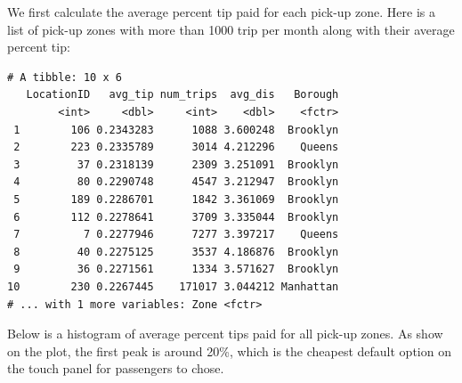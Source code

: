 \documentclass[12pt,twoside]{reedthesis}
\newenvironment{Shaded}{\begin{snugshade}}{\end{snugshade}}
\newcommand{\KeywordTok}[1]{\textcolor[rgb]{0.13,0.29,0.53}{\textbf{#1}}}
\newcommand{\DataTypeTok}[1]{\textcolor[rgb]{0.13,0.29,0.53}{#1}}
\newcommand{\DecValTok}[1]{\textcolor[rgb]{0.00,0.00,0.81}{#1}}
\newcommand{\FloatTok}[1]{\textcolor[rgb]{0.00,0.00,0.81}{#1}}
\newcommand{\StringTok}[1]{\textcolor[rgb]{0.31,0.60,0.02}{#1}}
\newcommand{\OperatorTok}[1]{\textcolor[rgb]{0.81,0.36,0.00}{\textbf{#1}}}
\newcommand{\NormalTok}[1]{#1}
\theoremstyle{definition}
\theoremstyle{definition}
\theoremstyle{definition}
\theoremstyle{remark}
\begin{document}
We first calculate the average percent tip paid for each pick-up zone.
Here is a list of pick-up zones with more than 1000 trip per month along
with their average percent tip:
\begin{Shaded}
\end{Shaded}
\begin{verbatim}
# A tibble: 10 x 6
   LocationID   avg_tip num_trips  avg_dis   Borough
        <int>     <dbl>     <int>    <dbl>    <fctr>
 1        106 0.2343283      1088 3.600248  Brooklyn
 2        223 0.2335789      3014 4.212296    Queens
 3         37 0.2318139      2309 3.251091  Brooklyn
 4         80 0.2290748      4547 3.212947  Brooklyn
 5        189 0.2286701      1842 3.361069  Brooklyn
 6        112 0.2278641      3709 3.335044  Brooklyn
 7          7 0.2277946      7277 3.397217    Queens
 8         40 0.2275125      3537 4.186876  Brooklyn
 9         36 0.2271561      1334 3.571627  Brooklyn
10        230 0.2267445    171017 3.044212 Manhattan
# ... with 1 more variables: Zone <fctr>
\end{verbatim}
Below is a histogram of average percent tips paid for all pick-up zones.
As show on the plot, the first peak is around 20\%, which is the
cheapest default option on the touch panel for passengers to chose.
\end{document}

